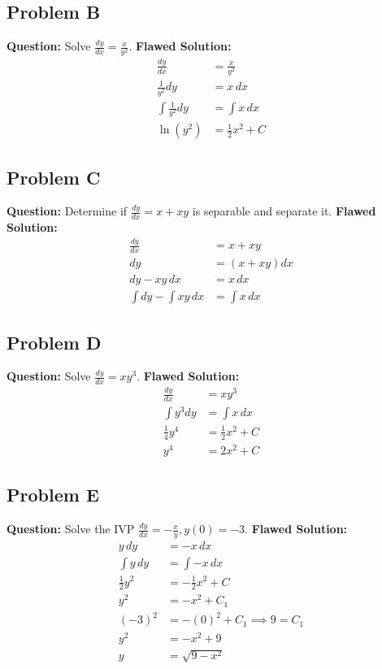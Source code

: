 \documentclass[11pt]{article}
\begin{document}
\subsection*{Problem B}
\textbf{Question:} Solve $\frac{dy}{dx} = \frac{x}{y^2}$.
\newline
\textbf{Flawed Solution:}
\begin{align*}
    \frac{dy}{dx} &= \frac{x}{y^2} \\
    \frac{1}{y^2} dy &= x \, dx \\
    \int \frac{1}{y^2} dy &= \int x \, dx \\
    \ln(y^2) &= \frac{1}{2}x^2 + C 
\end{align*}

\subsection*{Problem C}
\textbf{Question:} Determine if $\frac{dy}{dx} = x + xy$ is separable and separate it.
\newline
\textbf{Flawed Solution:}
\begin{align*}
    \frac{dy}{dx} &= x + xy \\
    dy &= (x + xy)dx \\
    dy - xy \, dx &= x \, dx \\
    \int dy - \int xy \, dx &= \int x \, dx
\end{align*}

\subsection*{Problem D}
\textbf{Question:} Solve $\frac{dy}{dx} = x y^3$.
\newline
\textbf{Flawed Solution:}
\begin{align*}
    \frac{dy}{dx} &= x y^3 \\
    \int y^3 dy &= \int x \, dx \\
    \frac{1}{4}y^4 &= \frac{1}{2}x^2 + C \\
    y^4 &= 2x^2 + C
\end{align*}

\subsection*{Problem E}
\textbf{Question:} Solve the IVP $\frac{dy}{dx} = -\frac{x}{y}, y(0) = -3$.
\newline
\textbf{Flawed Solution:}
\begin{align*}
    y \, dy &= -x \, dx \\
    \int y \, dy &= \int -x \, dx \\
    \frac{1}{2}y^2 &= -\frac{1}{2}x^2 + C \\
    y^2 &= -x^2 + C_1 \\
    (-3)^2 &= -(0)^2 + C_1 \implies 9 = C_1 \\
    y^2 &= -x^2 + 9 \\
    y &= \sqrt{9 - x^2}
\end{align*}
\end{document}
